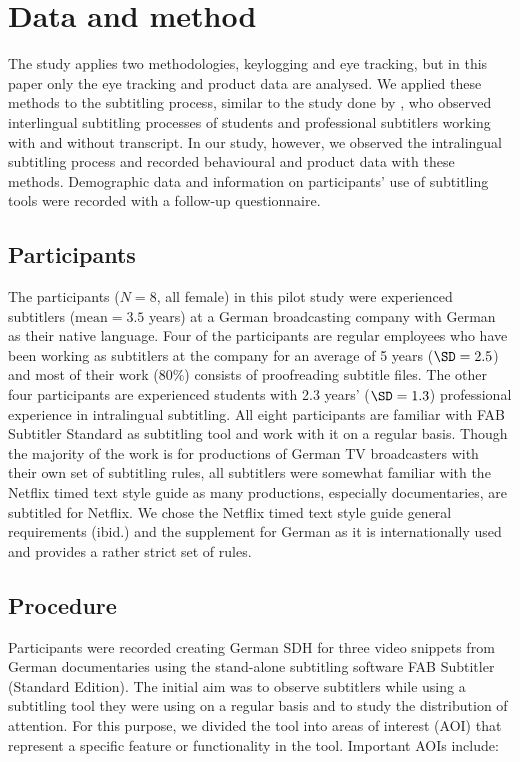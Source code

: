 \documentclass[output=paper]{langscibook}
\begin{document}
\section{Data and method}
The study applies two methodologies, keylogging and eye tracking, but in this paper only the eye tracking and product data are analysed.
We applied these methods to the subtitling process, similar to the study done by \citet{orrego2018using}, who observed interlingual subtitling processes of students and professional subtitlers working with and without transcript.
In our study, however, we observed the intralingual subtitling process and recorded behavioural and product data with these methods.
Demographic data and information on participants' use of subtitling tools were recorded with a follow-up questionnaire.

\subsection{Participants}\label{sec:tardel:4.1}
The participants ($N=8$, all female) in this pilot study were experienced subtitlers ($\text{mean} =3.5$ years) at a German broadcasting company with German as their native language.
Four of the participants are regular employees who have been working as subtitlers at the company for an average of 5 years ($\SD=2.5$) and most of their work ($80\%$) consists of proofreading subtitle files.
The other four participants are experienced students with 2.3 years' ($\SD=1.3$) professional experience in intralingual subtitling.
All eight participants are familiar with FAB Subtitler Standard as subtitling tool and work with it on a regular basis.
Though the majority of the work is for productions of German TV broadcasters with their own set of subtitling rules, all subtitlers were somewhat familiar with the Netflix timed text style guide \citep{netflix2018timed} as many productions, especially documentaries, are subtitled for Netflix.
We chose the Netflix timed text style guide general requirements (ibid.) and the supplement for German as it is internationally used and provides a rather strict set of rules.

\subsection{Procedure} 
Participants were recorded creating German SDH for three video snippets from German documentaries using the stand-alone subtitling software FAB Subtitler (Standard Edition).
The initial aim was to observe subtitlers while using a subtitling tool they were using on a regular basis and to study the distribution of attention.
For this purpose, we divided the tool into areas of interest (AOI) that represent a specific feature or functionality in the tool.
Important AOIs include:
\end{document}
